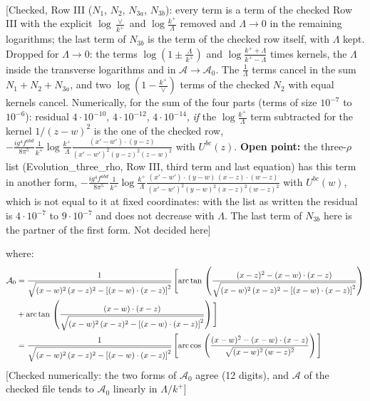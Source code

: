 \documentclass[9pt]{article}
\numberwithin{equation}{section}
\begin{document}
\begin{align}
\end{align} {\color{red}[Checked, Row III ($N_{1}$, $N_{2}$, $N_{3a}$, $N_{3b}$): every term is a term of the checked Row III with the explicit $\log\frac{\vee}{k^{+}}$ and $\log\frac{k^{+}}{\Lambda}$ removed and $\Lambda\to0$ in the remaining logarithms; the last term of $N_{3b}$ is the term of the checked row itself, with $\Lambda$ kept. Dropped for $\Lambda\to0$: the terms $\log(1\pm\frac{\Lambda}{k^{+}})$ and $\log\frac{k^{+}+\Lambda}{k^{+}-\Lambda}$ times kernels, the $\Lambda$ inside the transverse logarithms and in $\mathcal{A}\to\mathcal{A}_{0}$. The $\frac{1}{\Lambda}$ terms cancel in the sum $N_{1}+N_{2}+N_{3a}$, and two $\log(1-\frac{k^{+}}{\vee})$ terms of the checked $N_{2}$ with equal kernels cancel. Numerically, for the sum of the four parts (terms of size $10^{-7}$ to $10^{-6}$): residual $4\cdot10^{-10}$, $4\cdot10^{-12}$, $4\cdot10^{-14}$, \emph{if} the $\log\frac{k^{+}}{\Lambda}$ term subtracted for the kernel $1/(z-w)^{2}$ is the one of the checked row, $-\frac{ig^{4}f^{abd}}{8\pi^{5}}\frac{1}{k^{+}}\log\frac{k^{+}}{\Lambda}\frac{(x'-w')\cdot(y-z)}{(x'-w')^{2}(y-z)^{2}(z-w)^{2}}$ with $U^{bc}(z)$. \textbf{Open point:} the three-$\rho$ list (Evolution\_three\_rho, Row III, third term and last equation) has this term in another form, $-\frac{ig^{4}f^{abd}}{8\pi^{5}}\frac{1}{k^{+}}\log\frac{k^{+}}{\Lambda}\frac{(x'-w')\cdot(y-w)\,(x-z)\cdot(w-z)}{(x'-w')^{2}(y-w)^{2}(x-z)^{2}(w-z)^{2}}$ with $U^{bc}(w)$, which is not equal to it at fixed coordinates: with the list as written the residual is $4\cdot10^{-7}$ to $9\cdot10^{-7}$ and does not decrease with $\Lambda$. The last term of $N_{3b}$ here is the partner of the first form. Not decided here]}\par\noindent
where: \begin{align}
\mathcal{A}_{0} & = \frac{1}{\sqrt{(x-w)^{2}\,(x-z)^{2}-\left[(x-w)\cdot (x-z)\right]^{2}}}\, \Bigg[\mathrm{arc\,tan}\,\left(\frac{(x-z)^{2}-(x-w)\cdot (x-z)}{\sqrt{(x-w)^{2}\,(x-z)^{2}-\left[(x-w)\cdot (x-z)\right]^{2}}}\right)\notag \\ & + \mathrm{arc\,tan}\,\left(\frac{(x-w)\cdot (x-z)}{\sqrt{(x-w)^{2}\,(x-z)^{2}-\left[(x-w)\cdot (x-z)\right]^{2}}}\right) \Bigg]\notag \\ & = \frac{1}{\sqrt{(x-w)^{2}\,(x-z)^{2}-\left[(x-w)\cdot (x-z)\right]^{2}}}\, \Bigg[\mathrm{arc\,cos}\,\left(\frac{(x-w)^{2}-(x-w)\cdot (x-z)}{\sqrt{(x-w)^{2}\,(w-z)^{2}}}\right)\Bigg]
\end{align} {\color{red}[Checked numerically: the two forms of $\mathcal{A}_{0}$ agree (12 digits), and $\mathcal{A}$ of the checked file tends to $\mathcal{A}_{0}$ linearly in $\Lambda/k^{+}$]}\par\noindent
\end{document}
